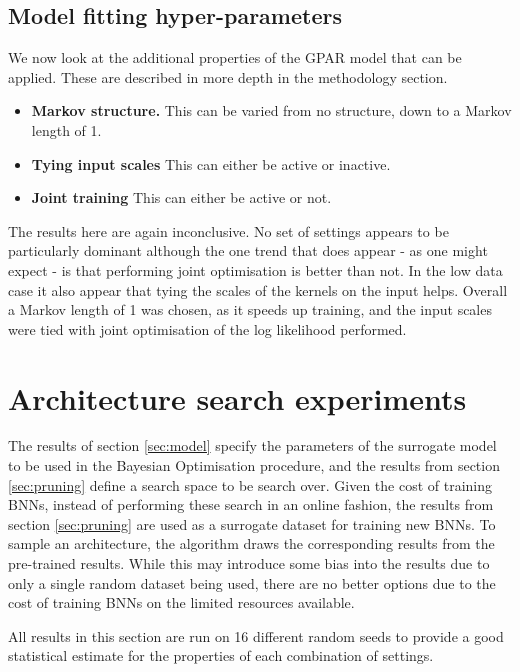 \subsection{Model fitting hyper-parameters}

We now look at the additional properties of the GPAR model that can be applied. These are described in more depth in the methodology section.
\begin{itemize}
	\item \textbf{Markov structure.} This can be varied from no structure, down to a Markov length of 1.
	\item \textbf{Tying input scales} This can either be active or inactive.
	\item  \textbf{Joint training} This can either be active or not.
\end{itemize}

The results here are again inconclusive. No set of settings appears to be particularly dominant although the one trend that does appear - as one might expect - is that performing joint optimisation is better than not. In the low data case it also appear that tying the scales of the kernels on the input helps. Overall a Markov length of 1 was chosen, as it speeds up training, and the input scales were tied with joint optimisation of the log likelihood performed.

\section{Architecture search experiments} 
\label{sec:archsearch}

The results of section \ref{sec:model} specify the parameters of the surrogate model to be used in the Bayesian Optimisation procedure, and the results from section \ref{sec:pruning} define a search space to be search over. Given the cost of training BNNs, instead of performing these search in an online fashion, the results from section \ref{sec:pruning} are used as a surrogate dataset for training new BNNs. To sample an architecture, the algorithm draws the corresponding results from the pre-trained results. While this may introduce some bias into the results due to only a single random dataset being used, there are no better options due to the cost of training BNNs on the limited resources available.

All results in this section are run on 16 different random seeds to provide a good statistical estimate for the properties of each combination of settings.

